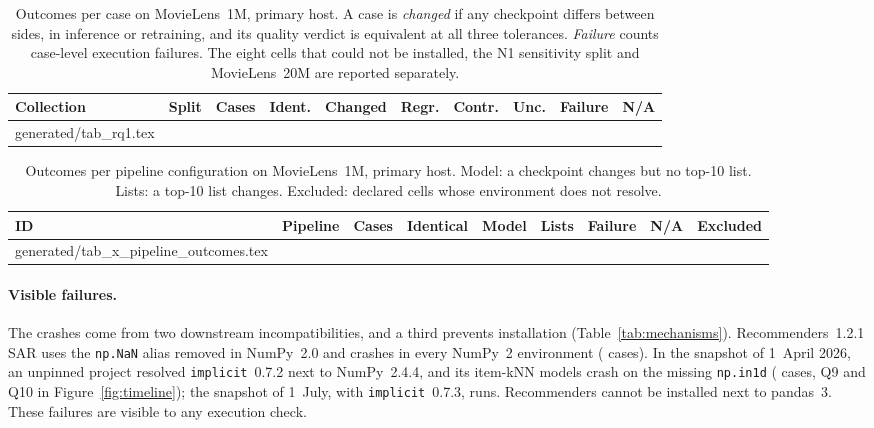 \documentclass[11pt,a4paper]{article}
\makeatletter
\newcommand{\tablebody}[1]{\@@input generated/#1.tex }
\makeatother
\begin{document}
\begin{table}[htbp]
  \centering
  \caption{Outcomes per case on MovieLens~1M, primary host. A case is
    \emph{changed} if any checkpoint differs between sides, in inference or
    retraining, and its quality verdict is equivalent at all three tolerances.
    \emph{Failure} counts case-level execution failures. The eight cells that
    could not be installed, the N1 sensitivity split and MovieLens~20M are
    reported separately.}
  \label{tab:rq1}
  \footnotesize\setlength{\tabcolsep}{3pt}
  \begin{tabular}{@{}llrrrrrrrr@{}}
    \toprule
    Collection & Split & Cases & Ident. & Changed & Regr. & Contr. & Unc. & Failure & N/A \\
    \midrule
    \tablebody{tab_rq1}
    \bottomrule
  \end{tabular}
\end{table}

\begin{table}[htbp]
  \centering
  \caption{Outcomes per pipeline configuration on MovieLens~1M, primary host.
    Model: a checkpoint changes but no top-10 list. Lists: a top-10 list
    changes. Excluded: declared cells whose environment does not resolve.}
  \label{tab:pipeline-outcomes}
  \footnotesize\setlength{\tabcolsep}{4pt}
  \begin{tabular}{@{}llrrrrrrr@{}}
    \toprule
    ID & Pipeline & Cases & Identical & Model & Lists & Failure & N/A & Excluded \\
    \midrule
    \tablebody{tab_x_pipeline_outcomes}
    \bottomrule
  \end{tabular}
\end{table}

\paragraph{Visible failures.} The \nFailure{} crashes come from two
downstream incompatibilities, and a third prevents installation
(Table~\ref{tab:mechanisms}). Recommenders~1.2.1 SAR uses the \texttt{np.NaN}
alias removed in NumPy~2.0 and crashes in every NumPy~2 environment
(\nCasesMechSix{} cases). In the snapshot of 1~April 2026, an unpinned project
resolved \texttt{implicit}~0.7.2 next to NumPy~2.4.4, and its item-kNN models
crash on the missing \texttt{np.in1d} (\nCasesMechSeven{} cases, Q9 and Q10 in
Figure~\ref{fig:timeline}); the snapshot of 1~July, with
\texttt{implicit}~0.7.3, runs. Recommenders cannot be installed next to
pandas~3. These failures are visible to any execution check.
\end{document}
